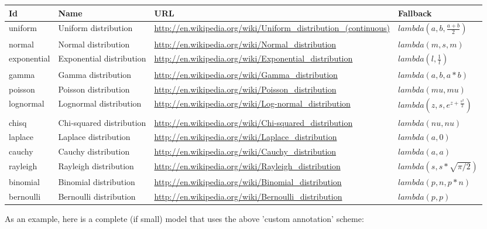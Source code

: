 \documentclass[draftspec]{sbmlpkgspec}
\begin{document}
\begin{longtabu} to \linewidth {
    X[2,c]
    X[3,c]
    X[12,c]
    X[4,l]}
\textbf{Id} & \textbf{Name} & \textbf{URL} & \textbf{Fallback} \\ \midrule
uniform & Uniform distribution & \footnotesize{\url{http://en.wikipedia.org/wiki/Uniform_distribution_(continuous)}} &\small{$lambda(a,b,\frac{a+b}{2})$}
\\ \midrule
normal & Normal distribution & \footnotesize{\url{http://en.wikipedia.org/wiki/Normal_distribution}} &\small{$lambda(m,s,m)$}
\\ \midrule
exponential & Exponential distribution & \footnotesize{\url{http://en.wikipedia.org/wiki/Exponential_distribution}} &\small{$lambda(l,\frac{1}{l})$}
\\ \midrule
gamma & Gamma distribution & \footnotesize{\url{http://en.wikipedia.org/wiki/Gamma_distribution}} &\small{$lambda(a,b,a*b)$}
\\ \midrule
poisson & Poisson distribution & \footnotesize{\url{http://en.wikipedia.org/wiki/Poisson_distribution}} &\small{$lambda(mu,mu)$}
\\ \midrule
lognormal & Lognormal distribution & \footnotesize{\url{http://en.wikipedia.org/wiki/Log-normal_distribution}} &\small{$lambda(z,s,e^{z+\frac{s^2}{2}})$}
\\ \midrule
chisq & Chi-squared distribution & \footnotesize{\url{http://en.wikipedia.org/wiki/Chi-squared_distribution}} &\small{$lambda(nu,nu)$}
\\ \midrule
laplace & Laplace distribution & \footnotesize{\url{http://en.wikipedia.org/wiki/Laplace_distribution}} &\small{$lambda(a,0)$}
\\ \midrule
cauchy & Cauchy distribution & \footnotesize{\url{http://en.wikipedia.org/wiki/Cauchy_distribution}} &\small{$lambda(a,a)$}
\\ \midrule
rayleigh & Rayleigh distribution & \footnotesize{\url{http://en.wikipedia.org/wiki/Rayleigh_distribution}} &\small{$lambda(s,s*\sqrt{\pi/2})$}
\\ \midrule
binomial & Binomial distribution & \footnotesize{\url{http://en.wikipedia.org/wiki/Binomial_distribution}} &\small{$lambda(p,n,p*n)$}
\\ \midrule
bernoulli & Bernoulli distribution & \footnotesize{\url{http://en.wikipedia.org/wiki/Bernoulli_distribution}} &\small{$lambda(p,p)$}
\\
\bottomrule
\end{longtabu}

As an example, here is a complete (if small) model that uses the above 'custom annotation' scheme:
\end{document}
